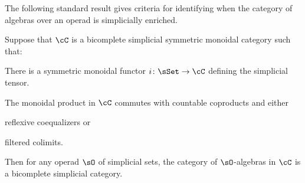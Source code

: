 \documentclass[leqno,oneside,english]{elsarticle}
\begin{document}
The following standard result gives criteria for identifying when the
category of algebras over an operad is simplicially enriched.
\begin{prop}\label{prop:algebras-over-an-operad-is-bicomplete}
  Suppose that $\cC$ is a bicomplete simplicial symmetric monoidal
  category such that:
  \begin{hypothenumerate}
  \item There is a symmetric monoidal functor $ i\colon \sSet\rightarrow
  \cC$
    defining the simplicial tensor.
  \item The monoidal product in $\cC$ commutes with countable coproducts
  and either\label{it:tensor-commutes}
    \begin{hypothenumerate}
      \item reflexive coequalizers or
      \item filtered colimits.
    \end{hypothenumerate}

  \end{hypothenumerate}
  Then for any operad $\sO$ of simplicial sets, the category of
  $\sO$-algebras in $\cC$ is a bicomplete simplicial category.
\end{prop}
\end{document}
